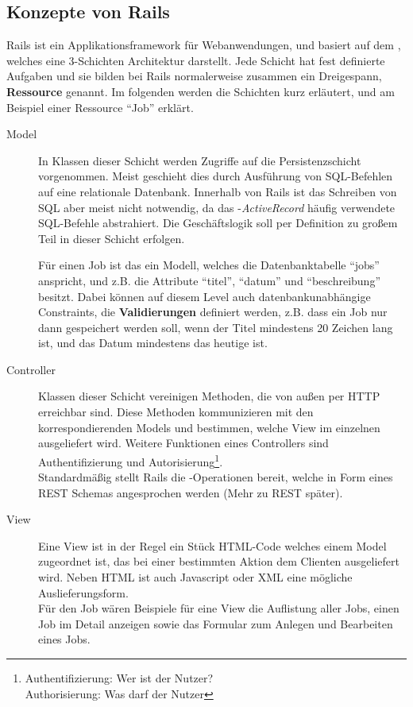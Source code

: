 \subsection{Konzepte von Rails}
\label{sec:railsconcepts}
Rails ist ein Applikationsframework für Webanwendungen, und basiert auf dem  , welches eine 3-Schichten Architektur darstellt. Jede Schicht hat fest definierte Aufgaben und sie bilden bei Rails normalerweise zusammen ein Dreigespann, \textbf{Ressource} genannt. Im folgenden werden die Schichten kurz erläutert, und am Beispiel einer Ressource "`Job"' erklärt.
\begin{description}
 \item[Model] In Klassen dieser Schicht werden Zugriffe auf die Persistenzschicht vorgenommen. Meist geschieht dies durch Ausführung von SQL-Befehlen auf eine relationale Datenbank. Innerhalb von Rails ist das Schreiben von SQL aber meist nicht notwendig, da das -\textit{ActiveRecord} häufig verwendete SQL-Befehle abstrahiert. Die Geschäftslogik soll per Definition zu großem Teil in dieser Schicht erfolgen.

 Für einen Job ist das ein Modell, welches die Datenbanktabelle "`jobs"' anspricht, und z.B. die Attribute "`titel"', "`datum"' und "`beschreibung"' besitzt. Dabei können auf diesem Level auch datenbankunabhängige Constraints, die \textbf{Validierungen} definiert werden, z.B. dass ein Job nur dann gespeichert werden soll, wenn der Titel mindestens 20 Zeichen lang ist, und das Datum mindestens das heutige ist.
 \item[Controller] Klassen dieser Schicht vereinigen Methoden, die von außen per HTTP erreichbar sind. Diese Methoden kommunizieren mit den korrespondierenden Models und bestimmen, welche View im einzelnen ausgeliefert wird. Weitere Funktionen eines Controllers sind Authentifizierung und Autorisierung\footnote{Authentifizierung: Wer ist der Nutzer?\\Authorisierung: Was darf der Nutzer}.\\
 Standardmäßig stellt Rails die -Operationen bereit, welche in Form eines REST Schemas angesprochen werden (Mehr zu REST später).
 \item[View] Eine View ist in der Regel ein Stück HTML-Code welches einem Model zugeordnet ist, das bei einer bestimmten Aktion dem Clienten ausgeliefert wird. Neben HTML ist auch Javascript oder XML eine mögliche Auslieferungsform.\\
 Für den Job wären Beispiele für eine View die Auflistung aller Jobs, einen Job im Detail anzeigen sowie das Formular zum Anlegen und Bearbeiten eines Jobs.
 \end{description}
